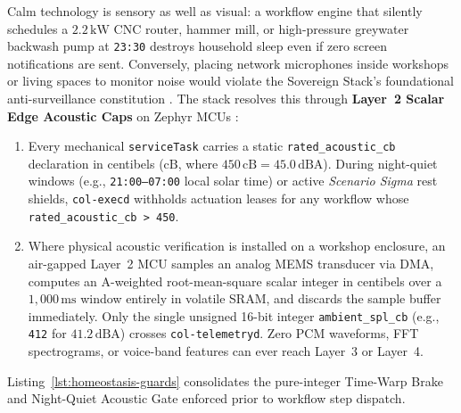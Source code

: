 Calm technology is sensory as well as visual: a workflow engine that silently schedules a $2.2\,\text{kW}$ CNC router, hammer mill, or high-pressure greywater backwash pump at \texttt{23:30} destroys household sleep even if zero screen notifications are sent. Conversely, placing network microphones inside workshops or living spaces to monitor noise would violate the Sovereign Stack's foundational anti-surveillance constitution \parencite{zuboff2019}. The stack resolves this through \textbf{Layer~2 Scalar Edge Acoustic Caps} on Zephyr MCUs \parencite{zephyr2024}:
\begin{enumerate}
  \item Every mechanical \texttt{serviceTask} carries a static \texttt{rated\_acoustic\_cb} declaration in centibels ($\text{cB}$, where $450\,\text{cB} = 45.0\,\text{dBA}$). During night-quiet windows (e.g., \texttt{21:00--07:00} local solar time) or active \emph{Scenario Sigma} rest shields, \texttt{col-execd} withholds actuation leases for any workflow whose \texttt{rated\_acoustic\_cb > 450}.
  \item Where physical acoustic verification is installed on a workshop enclosure, an air-gapped Layer~2 MCU samples an analog MEMS transducer via DMA, computes an A-weighted root-mean-square scalar integer in centibels over a $1{,}000\,\text{ms}$ window entirely in volatile SRAM, and discards the sample buffer immediately. Only the single unsigned 16-bit integer \texttt{ambient\_spl\_cb} (e.g., \texttt{412} for $41.2\,\text{dBA}$) crosses \texttt{col-telemetryd}. Zero PCM waveforms, FFT spectrograms, or voice-band features can ever reach Layer~3 or Layer~4.
\end{enumerate}

Listing~\ref{lst:homeostasis-guards} consolidates the pure-integer Time-Warp Brake and Night-Quiet Acoustic Gate enforced prior to workflow step dispatch.

